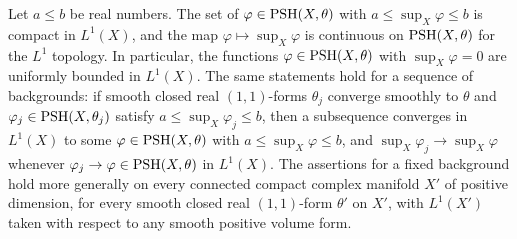 \begin{proposition}\label{prop:normalized-global-psh-compactness}
Let $a\leq b$ be real numbers. The set of $\varphi\in\mathrm{PSH}(X,\theta)$ with $a\leq\sup_X\varphi\leq b$ is compact in $L^1(X)$, and the map $\varphi\mapsto\sup_X\varphi$ is continuous on $\mathrm{PSH}(X,\theta)$ for the $L^1$ topology. In particular, the functions $\varphi\in\mathrm{PSH}(X,\theta)$ with $\sup_X\varphi=0$ are uniformly bounded in $L^1(X)$. The same statements hold for a sequence of backgrounds: if smooth closed real $(1,1)$-forms $\theta_j$ converge smoothly to $\theta$ and $\varphi_j\in\mathrm{PSH}(X,\theta_j)$ satisfy $a\leq\sup_X\varphi_j\leq b$, then a subsequence converges in $L^1(X)$ to some $\varphi\in\mathrm{PSH}(X,\theta)$ with $a\leq\sup_X\varphi\leq b$, and $\sup_X\varphi_j\to\sup_X\varphi$ whenever $\varphi_j\to\varphi\in\mathrm{PSH}(X,\theta)$ in $L^1(X)$. The assertions for a fixed background hold more generally on every connected compact complex manifold $X'$ of positive dimension, for every smooth closed real $(1,1)$-form $\theta'$ on $X'$, with $L^1(X')$ taken with respect to any smooth positive volume form.
\end{proposition}
